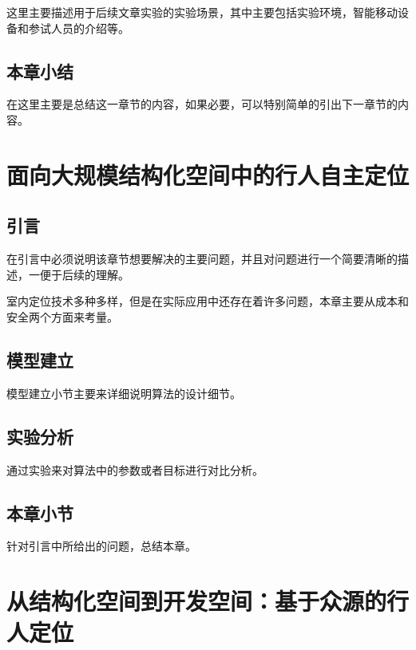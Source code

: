 这里主要描述用于后续文章实验的实验场景，其中主要包括实验环境，智能移动设备和参试人员的介绍等。

\section{本章小结}

在这里主要是总结这一章节的内容，如果必要，可以特别简单的引出下一章节的内容。




\chapter{面向大规模结构化空间中的行人自主定位}

\section{引言}

在引言中必须说明该章节想要解决的主要问题，并且对问题进行一个简要清晰的描述，一便于后续的理解。

室内定位技术多种多样，但是在实际应用中还存在着许多问题，本章主要从成本和安全两个方面来考量。

\section{模型建立}

模型建立小节主要来详细说明算法的设计细节。

\section{实验分析}

通过实验来对算法中的参数或者目标进行对比分析。

\section{本章小节}

针对引言中所给出的问题，总结本章。




\chapter{从结构化空间到开发空间：基于众源的行人定位}

